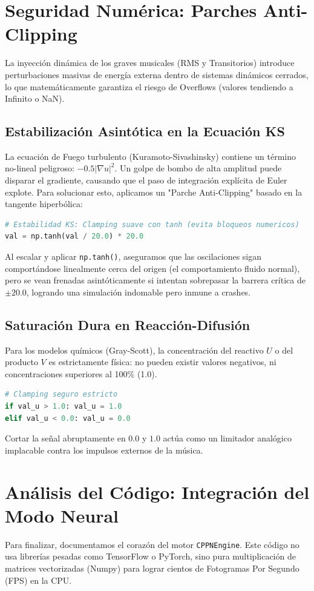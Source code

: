 \documentclass[12pt, openany]{book}
\begin{document}
\chapter{Seguridad Numérica: Parches Anti-Clipping}
La inyección dinámica de los graves musicales (RMS y Transitorios) introduce perturbaciones masivas de energía externa dentro de sistemas dinámicos cerrados, lo que matemáticamente garantiza el riesgo de Overflows (valores tendiendo a Infinito o NaN).

\section{Estabilización Asintótica en la Ecuación KS}
La ecuación de Fuego turbulento (Kuramoto-Sivashinsky) contiene un término no-lineal peligroso: $-0.5 |\nabla u|^2$. Un golpe de bombo de alta amplitud puede disparar el gradiente, causando que el paso de integración explícita de Euler explote. Para solucionar esto, aplicamos un "Parche Anti-Clipping" basado en la tangente hiperbólica:
\begin{lstlisting}[language=Python]
# Estabilidad KS: Clamping suave con tanh (evita bloqueos numericos)
val = np.tanh(val / 20.0) * 20.0
\end{lstlisting}
Al escalar y aplicar \texttt{np.tanh()}, aseguramos que las oscilaciones sigan comportándose linealmente cerca del origen (el comportamiento fluido normal), pero se vean frenadas asintóticamente si intentan sobrepasar la barrera crítica de $\pm 20.0$, logrando una simulación indomable pero inmune a crashes.

\section{Saturación Dura en Reacción-Difusión}
Para los modelos químicos (Gray-Scott), la concentración del reactivo $U$ o del producto $V$ es estrictamente física: no pueden existir valores negativos, ni concentraciones superiores al 100\% (1.0).
\begin{lstlisting}[language=Python]
# Clamping seguro estricto
if val_u > 1.0: val_u = 1.0
elif val_u < 0.0: val_u = 0.0
\end{lstlisting}
Cortar la señal abruptamente en $0.0$ y $1.0$ actúa como un limitador analógico implacable contra los impulsos externos de la música.

\chapter{Análisis del Código: Integración del Modo Neural}
Para finalizar, documentamos el corazón del motor \texttt{CPPNEngine}. Este código no usa librerías pesadas como TensorFlow o PyTorch, sino pura multiplicación de matrices vectorizadas (Numpy) para lograr cientos de Fotogramas Por Segundo (FPS) en la CPU.
\end{document}
